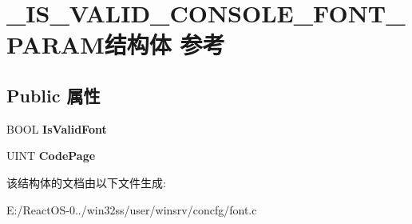 \hypertarget{struct___i_s___v_a_l_i_d___c_o_n_s_o_l_e___f_o_n_t___p_a_r_a_m}{}\section{\+\_\+\+I\+S\+\_\+\+V\+A\+L\+I\+D\+\_\+\+C\+O\+N\+S\+O\+L\+E\+\_\+\+F\+O\+N\+T\+\_\+\+P\+A\+R\+A\+M结构体 参考}
\label{struct___i_s___v_a_l_i_d___c_o_n_s_o_l_e___f_o_n_t___p_a_r_a_m}
\subsection*{Public 属性}
\begin{DoxyCompactItemize}
\item 
\mbox{\label{struct___i_s___v_a_l_i_d___c_o_n_s_o_l_e___f_o_n_t___p_a_r_a_m_ac957a0415323063be89257ec56c16196}} 
B\+O\+OL {\bfseries Is\+Valid\+Font}
\item 
\mbox{\label{struct___i_s___v_a_l_i_d___c_o_n_s_o_l_e___f_o_n_t___p_a_r_a_m_ad665eaaf227c94de746f21cb43a9081e}} 
U\+I\+NT {\bfseries Code\+Page}
\end{DoxyCompactItemize}


该结构体的文档由以下文件生成\+:\begin{DoxyCompactItemize}
\item 
E\+:/\+React\+O\+S-\/0../win32ss/user/winsrv/concfg/font.\+c\end{DoxyCompactItemize}
